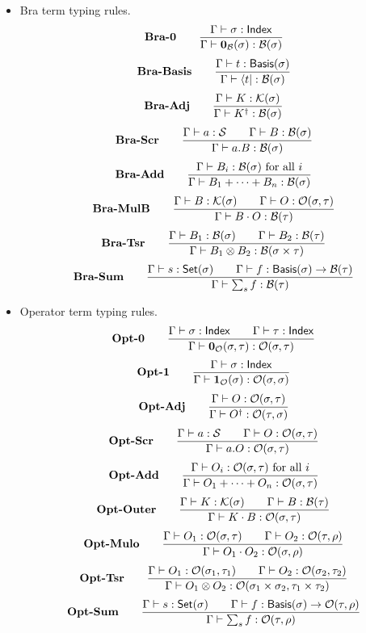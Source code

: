 \begin{itemize}
    \item Bra term typing rules.
    \[
        \textbf{Bra-0} \qquad
        \frac{\Gamma \vdash \sigma : \mathsf{Index}}{\Gamma \vdash \mathbf{0}_\mathcal{B}(\sigma) : \mathcal{B}(\sigma)}
    \]
    \[
        \textbf{Bra-Basis} \qquad
        \frac{\Gamma\vdash t : \mathsf{Basis}(\sigma)}{\Gamma \vdash \bra{t} : \mathcal{B}(\sigma)}
    \]
    \[
        \textbf{Bra-Adj} \qquad
        \frac{\Gamma \vdash K : \mathcal{K}(\sigma)}{\Gamma \vdash K^\dagger : \mathcal{B}(\sigma)}
    \]
    \[
        \textbf{Bra-Scr} \qquad
        \frac{\Gamma \vdash a : \mathcal{S} \qquad \Gamma \vdash B : \mathcal{B}(\sigma)}{\Gamma \vdash a.B : \mathcal{B}(\sigma)}
    \]
    \[
        \textbf{Bra-Add} \qquad
        \frac{\Gamma \vdash B_i : \mathcal{B}(\sigma) \text{ for all $i$}}{\Gamma \vdash B_1 + \cdots + B_n : \mathcal{B}(\sigma)}
    \]
    \[
        \textbf{Bra-MulB} \qquad
        \frac{\Gamma \vdash B : \mathcal{K}(\sigma) \qquad \Gamma \vdash O : \mathcal{O}(\sigma, \tau)}{\Gamma \vdash B \cdot O : \mathcal{B}(\tau)}
    \]
    \[
        \textbf{Bra-Tsr} \qquad
        \frac{\Gamma \vdash B_1 : \mathcal{B}(\sigma) \qquad \Gamma \vdash B_2 : \mathcal{B}(\tau)} {\Gamma \vdash B_1 \otimes B_2 : \mathcal{B}(\sigma \times \tau)}
    \]
    \[
        \textbf{Bra-Sum} \qquad
        \frac{\Gamma \vdash s : \mathsf{Set}(\sigma) \qquad \Gamma \vdash f : \mathsf{Basis}(\sigma) \to \mathcal{B}(\tau)}{\Gamma \vdash \sum_{s} f : \mathcal{B}(\tau)}
    \]

    \item Operator term typing rules.
    \[
        \textbf{Opt-0} \qquad
        \frac{\Gamma \vdash \sigma : \mathsf{Index} \qquad \Gamma \vdash \tau : \mathsf{Index}}{\Gamma \vdash \mathbf{0}_\mathcal{O}(\sigma, \tau) : \mathcal{O}(\sigma, \tau)}
    \]
    \[
        \textbf{Opt-1} \qquad
        \frac{\Gamma \vdash \sigma : \mathsf{Index}}{\Gamma \vdash \mathbf{1}_\mathcal{O}(\sigma) : \mathcal{O}(\sigma, \sigma)}
    \]
    \[
        \textbf{Opt-Adj} \qquad
        \frac{\Gamma \vdash O : \mathcal{O}(\sigma, \tau)}{\Gamma \vdash O^\dagger : \mathcal{O}(\tau, \sigma)}
    \]
    \[
        \textbf{Opt-Scr} \qquad
        \frac{\Gamma \vdash a : \mathcal{S} \qquad \Gamma \vdash O : \mathcal{O}(\sigma, \tau)}{\Gamma \vdash a.O : \mathcal{O}(\sigma, \tau)}
    \]
    \[
        \textbf{Opt-Add} \qquad
        \frac{\Gamma \vdash O_i : \mathcal{O}(\sigma, \tau) \text{ for all $i$}}{\Gamma \vdash O_1 + \cdots + O_n : \mathcal{O}(\sigma, \tau)}
    \]
    \[
        \textbf{Opt-Outer} \qquad
        \frac{\Gamma\vdash K : \mathcal{K}(\sigma) \qquad \Gamma\vdash B : \mathcal{B}(\tau)}{\Gamma\vdash K \cdot B : \mathcal{O}(\sigma, \tau)}
    \]
    \[
        \textbf{Opt-Mulo} \qquad
        \frac{\Gamma \vdash O_1 : \mathcal{O}(\sigma, \tau) \qquad \Gamma \vdash O_2 : \mathcal{O}(\tau, \rho)}{\Gamma \vdash O_1 \cdot O_2 : \mathcal{O}(\sigma, \rho)}
    \]
    \[
        \textbf{Opt-Tsr} \qquad
        \frac{\Gamma \vdash O_1 : \mathcal{O}(\sigma_1, \tau_1) \qquad \Gamma \vdash O_2 : \mathcal{O}(\sigma_2, \tau_2)} {\Gamma \vdash O_1 \otimes O_2 : \mathcal{O}(\sigma_1 \times \sigma_2, \tau_1 \times \tau_2)}
    \]
    \[
        \textbf{Opt-Sum} \qquad
        \frac{\Gamma \vdash s : \mathsf{Set}(\sigma) \qquad \Gamma \vdash f : \mathsf{Basis}(\sigma) \to \mathcal{O}(\tau, \rho)}{\Gamma \vdash \sum_{s} f : \mathcal{O}(\tau, \rho)}
    \]


\end{itemize}
